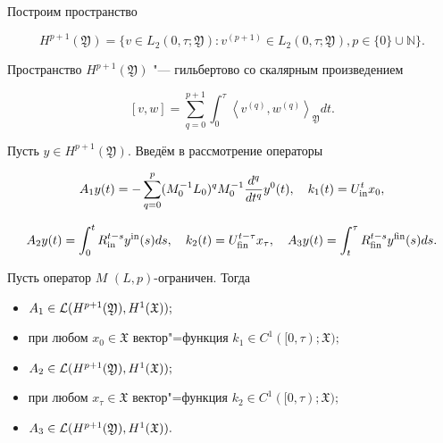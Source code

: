 Построим пространство

$$

{H}^{p+1} (\mathfrak Y) =\{v\in L_2 (0,\tau;\mathfrak Y): v^{(p+1)}\in L_2 (0, \tau; \mathfrak Y), p\in\{0\}\cup \mathbb N \}.

$$

Пространство ${H}^{p+1} (\mathfrak Y)$ "--- гильбертово со скалярным произведением

$$

[v, w]= \sum^{p+1}_{q=0}\int^{\tau}_{0}\left\langle v^{(q)}, w^{(q)}\right\rangle_\mathfrak Y dt.

$$

Пусть $y \in {H}^{p+1} (\mathfrak Y)$. Введём в рассмотрение операторы

$$

A_1y(t)=-\sum_{q=0}^p (M_0^{-1}L_0)^q M^{-1}_0 \frac{d^q}{dt^q}y^0(t),\quad

k_1(t) =  U^{t}_{\rm in} x_0,

$$

$$

A_2y(t) = \int_0^t R_{\rm in}^{t-s} y^{\rm in} (s) ds, \quad

k_2(t) = U^{t-\tau}_{\rm fin} x_{\tau}, \quad A_3 y(t)= \int_t^\tau R_{\rm fin}^{t-s} y^{\rm fin} (s) ds.

$$



\begin{lemma} Пусть оператор $M$ $(L,p)$-ограничен{\rm .} Тогда



\begin{itemize}

\item[\rm (i)] $ A_1\in {\cal L}({H}^{p+1} (\mathfrak Y), H^1 (\mathfrak X));$



\item[\rm (ii)]  при любом $x_0 \in \mathfrak X$ вектор"=функция $ k_1\in C^1([0,\tau); \mathfrak X);$



\item[\rm (iii)]  $ A_2\in {\cal L}({H}^{p+1} (\mathfrak Y), H^1 (\mathfrak X));$



\item[\rm (iv)]   при любом $x_{\tau} \in \mathfrak X$ вектор"=функция $ k_2\in C^1([0, \tau); \mathfrak X);$



\item[\rm (v)]   $ A_3\in {\cal L}({H}^{p+1} (\mathfrak Y), H^1 (\mathfrak X)).$

\end{itemize}

\end{lemma}



